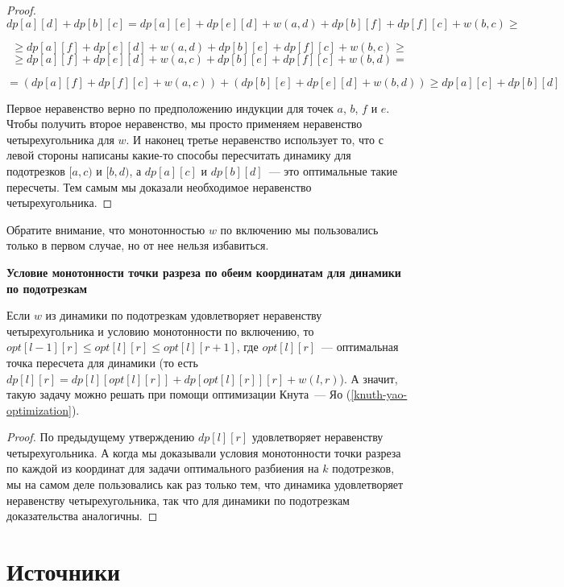 \begin{proof}
    $$dp[a][d] + dp[b][c] = dp[a][e] + dp[e][d] + w(a, d) + dp[b][f] + dp[f][c] + w(b, c) \ge $$

    $$ \ge dp[a][f] + dp[e][d] + w(a, d) + dp[b][e] + dp[f][c] + w(b, c) \ge$$
    $$ \ge dp[a][f] + dp[e][d] + w(a, c) + dp[b][e] + dp[f][c] + w(b, d) =$$

    $$= (dp[a][f] + dp[f][c] + w(a, c)) + (dp[b][e] + dp[e][d] + w(b, d)) \ge dp[a][c] + dp[b][d]$$

    Первое неравенство верно по предположению индукции для точек $a$, $b$, $f$ и $e$. Чтобы получить второе неравенство, мы просто применяем неравенство четырехугольника для $w$. И наконец третье неравенство использует то, что с левой стороны написаны какие-то способы пересчитать динамику для подотрезков $[a, c)$ и $[b, d)$, а $dp[a][c]$ и $dp[b][d]$~--- это оптимальные такие пересчеты. Тем самым мы доказали необходимое неравенство четырехугольника.
\end{proof}

\begin{observation}
    Обратите внимание, что монотонностью $w$ по включению мы пользовались только в первом случае, но от нее нельзя избавиться.
\end{observation}

\begin{proposition} \textbf{Условие монотонности точки разреза по обеим координатам для динамики по подотрезкам}
    
    Если $w$ из динамики по подотрезкам удовлетворяет неравенству четырехугольника и условию монотонности по включению, то $opt[l - 1][r] \le opt[l][r] \le opt[l][r + 1]$, где $opt[l][r]$~--- оптимальная точка пересчета для динамики (то есть $dp[l][r] = dp[l][opt[l][r]] + dp[opt[l][r]][r] + w(l, r)$). А значит, такую задачу можно решать при помощи оптимизации Кнута~--- Яо (\ref{knuth-yao-optimization}).
\end{proposition}

\begin{proof}
    По предыдущему утверждению $dp[l][r]$ удовлетворяет неравенству четырехугольника. А когда мы доказывали условия монотонности точки разреза по каждой из координат для задачи оптимального разбиения на $k$ подотрезков, мы на самом деле пользовались как раз только тем, что динамика удовлетворяет неравенству четырехугольника, так что для динамики по подотрезкам доказательства аналогичны.
\end{proof}


\section{Источники}

